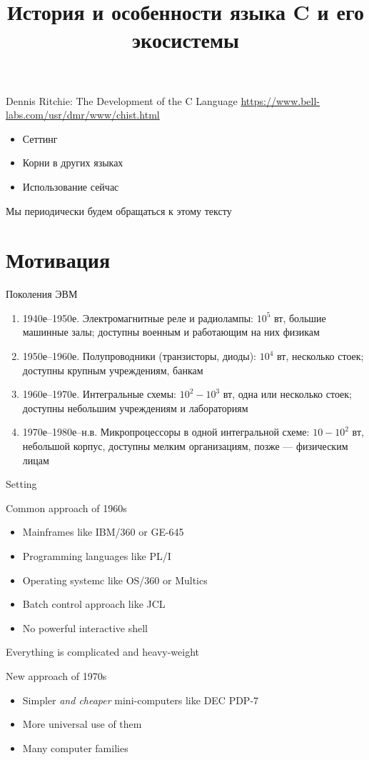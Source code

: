 \documentclass[xetex,aspectratio=169]{beamer}
\title[История C]{История и особенности языка C и его экосистемы}
\begin{document}
\titleslide

\tocslide

\begin{frame}{Dennis Ritchie: The Development of the C Language}
	\url{https://www.bell-labs.com/usr/dmr/www/chist.html}
	\begin{itemize}
		\item Сеттинг
		\item Корни в других языках
		\item Использование сейчас
	\end{itemize}
	Мы периодически будем обращаться к этому тексту
\end{frame}

\section{Мотивация}

\begin{frame}{Поколения ЭВМ}
	\begin{enumerate}
		\item 1940е--1950е. Электромагнитные реле и радиолампы: $10^5$ вт, большие машинные залы; доступны военным и работающим на них физикам
		\item 1950е--1960е. Полупроводники (транзисторы, диоды): $10^4$ вт, несколько стоек; доступны крупным учреждениям, банкам
		\item 1960е--1970е. Интегральные схемы: $10^2-10^3$ вт, одна или несколько стоек; доступны небольшим учреждениям и лабораториям
		\item 1970е--1980е--н.в. Микропроцессоры в одной интегральной схеме: $10-10^2$ вт, небольшой корпус, доступны мелким организациям, позже --- физическим лицам
	\end{enumerate}
\end{frame}

\begin{frame}{Setting}
	\begin{block}{Common approach of 1960s}
		\begin{itemize}
			\item Mainframes like IBM/360 or GE-645
			\item Programming languages like PL/I
			\item Operating systemc like OS/360 or Multics
			\item Batch control approach like JCL
			\item No powerful interactive shell
		\end{itemize}
		Everything is complicated and heavy-weight
	\end{block}
\pause
	\begin{block}{New approach of 1970s}
	\begin{itemize}
		\item Simpler \emph{and cheaper} mini-computers like DEC PDP-7
		\item More universal use of them
		\item Many computer families
	\end{itemize}
\end{block}
\end{frame}
\end{document}
